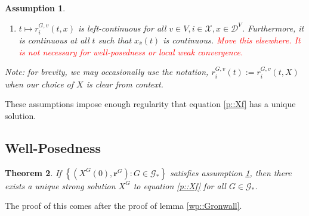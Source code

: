 \documentclass[12pt]{article}
\newcommand{\skipLine}{\vspace{12pt}}
\newcommand{\mc}{\mathcal}
\newcommand{\ov}{\overline}
\newcommand{\tr}{\textcolor{red}}
\newcommand{\defeq}{:=}								%
\newcommand{\cad}{\mc{D}}							%
\newcommand{\sta}{\mc{X}}							%
\newcommand{\cl}[1]{\ov{#1}}						%
\newcommand{\Xf}{X}									%
\newcommand{\rate}{r}								%
\newcommand{\xf}{x}									%
\newcommand{\vind}[1]{_{#1}}						%
\newcommand{\tme}[1]{(#1)}							%
\newcommand{\gind}[1]{^{#1}}						%
\newcommand{\vpara}[1]{^{#1}}						%
\newcommand{\stpara}[1]{_{#1}}						%
\newcommand{\gvpara}[2]{^{#1,#2}}					%
\newcommand{\rateset}{\mathbf{\rate}}				%
\newcommand{\tmepro}[2]{(#1,#2)}					%
\newcommand{\Gs}{\mc{G}_\ast}						%
\newtheorem{thms}{Theorem}[section]
\newtheorem{assu}[thms]{Assumption}
\begin{document}
\begin{assu}
\begin{enumerate}
\item \(t\mapsto \rate\gvpara{G}{v}\stpara{i}\tmepro{t}{\xf}\) is left-continuous for all \(v \in V,i\in \sta,\xf\in \cad\vpara{V}\). Furthermore, it is continuous at all \(t\) such that \(\xf\vind{\cl{v}}\tme{t}\) is continuous. \tr{Move this elsewhere. It is not necessary for well-posedness or local weak convergence.}
\end{enumerate}
\skipLine

Note: for brevity, we may occasionally use the notation, \(\rate\gvpara{G}{v}\stpara{i}\tme{t}\defeq \rate\gvpara{G}{v}\stpara{i}\tmepro{t}{\Xf}\) when our choice of \(\Xf\) is clear from context.
\label{a::pbasics}
\end{assu}

These assumptions impose enough regularity that equation \eqref{p::Xf} has a unique solution.

\subsection{Well-Posedness}
\label{awl::wp}

\begin{thms}
If \(\left\{(\Xf\gind{G}\tme{0},\rateset\gind{G}):G \in \Gs\right\}\) satisfies assumption \ref{a::pbasics}, then there exists a unique strong solution \(\Xf\gind{G}\) to equation \eqref{p::Xf} for all \(G \in \Gs\).
\label{wp::wp}
\end{thms}

The proof of this comes after the proof of lemma \ref{wp::Gronwall}.
\end{document}
